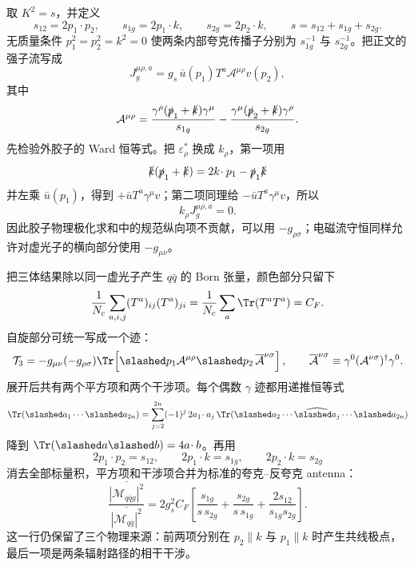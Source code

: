\begin{derivation}[三喷注产生的能量分布]
取 $K^2=s$，并定义
\begin{equation*}
s_{12}=2p_1\!\cdot p_2,\qquad
s_{1g}=2p_1\!\cdot k,\qquad
s_{2g}=2p_2\!\cdot k,\qquad
s=s_{12}+s_{1g}+s_{2g}.
\end{equation*}
无质量条件 $p_1^2=p_2^2=k^2=0$ 使两条内部夸克传播子分别为 $s_{1g}^{-1}$ 与 $s_{2g}^{-1}$。把正文的强子流写成
\begin{equation*}
J_g^{\mu\rho,a}
=g_s\,\bar u(p_1)T^a\mathcal A^{\mu\rho}v(p_2),
\end{equation*}
其中
\begin{equation*}
\mathcal A^{\mu\rho}
=\frac{\gamma^\rho(\slashed p_1+\slashed k)\gamma^\mu}{s_{1g}}
-\frac{\gamma^\mu(\slashed p_2+\slashed k)\gamma^\rho}{s_{2g}}.
\end{equation*}
先检验外胶子的 Ward 恒等式。把 $\varepsilon_\rho^*$ 换成 $k_\rho$，第一项用
\begin{equation*}
\slashed k(\slashed p_1+\slashed k)
=2k\!\cdot p_1-\slashed p_1\slashed k
\end{equation*}
并左乘 $\bar u(p_1)$，得到 $+\bar uT^a\gamma^\mu v$；第二项同理给 $-\bar uT^a\gamma^\mu v$，所以
\begin{equation*}
k_\rho J_g^{\mu\rho,a}=0.
\end{equation*}
因此胶子物理极化求和中的规范纵向项不贡献，可以用 $-g_{\rho\sigma}$；电磁流守恒同样允许对虚光子的横向部分使用 $-g_{\mu\nu}$。

把三体结果除以同一虚光子产生 $q\bar q$ 的 Born 张量，颜色部分只留下
\begin{equation*}
\frac1{N_c}\sum_{a,i,j}(T^a)_{ij}(T^a)_{ji}
=\frac1{N_c}\sum_a\Tr(T^aT^a)=C_F.
\end{equation*}
自旋部分可统一写成一个迹：
\begin{equation*}
\mathcal T_3
=-g_{\mu\nu}(-g_{\rho\sigma})
\Tr\!\left[
\slashed p_1\mathcal A^{\mu\rho}
\slashed p_2\,\overline{\mathcal A}^{\nu\sigma}
\right],
\qquad
\overline{\mathcal A}^{\nu\sigma}
\equiv\gamma^0(\mathcal A^{\nu\sigma})^\dagger\gamma^0.
\end{equation*}
展开后共有两个平方项和两个干涉项。每个偶数 $\gamma$ 迹都用递推恒等式
\begin{equation*}
\Tr(\slashed a_1\cdots\slashed a_{2n})
=\sum_{j=2}^{2n}(-1)^j\,2a_1\!\cdot a_j\,
\Tr(\slashed a_2\cdots\widehat{\slashed a_j}\cdots\slashed a_{2n})
\end{equation*}
降到 $\Tr(\slashed a\slashed b)=4a\!\cdot b$。再用
\begin{equation*}
2p_1\!\cdot p_2=s_{12},\qquad
2p_1\!\cdot k=s_{1g},\qquad
2p_2\!\cdot k=s_{2g}
\end{equation*}
消去全部标量积，平方项和干涉项合并为标准的夸克--反夸克 antenna：
\begin{equation*}
\frac{\overline{|\mathcal M_{q\bar qg}|^2}}
{\overline{|\mathcal M_{q\bar q}|^2}}
=2g_s^2C_F
\left[
\frac{s_{1g}}{s\,s_{2g}}
+\frac{s_{2g}}{s\,s_{1g}}
+\frac{2s_{12}}{s_{1g}s_{2g}}
\right].
\end{equation*}
这一行仍保留了三个物理来源：前两项分别在 $p_2\parallel k$ 与 $p_1\parallel k$ 时产生共线极点，最后一项是两条辐射路径的相干干涉。


\end{derivation}
